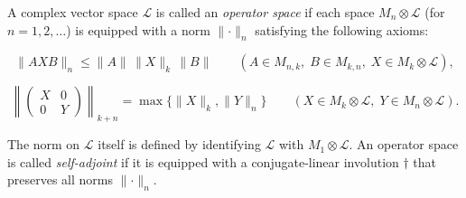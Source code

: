 \hypertarget{def:operator-space}{}%
\begin{definition}\label{def:operator-space}
A complex
vector space $\mathcal L$ is called an \emph{operator space} if each space
$M_n\otimes\mathcal L$ (for $n=1,2,\ldots$) is equipped with a norm
$\lVert\cdot\rVert_n$ satisfying the following axioms:

\[\lVert AXB\rVert_n \le \lVert A\rVert\,\lVert X\rVert_k\,\lVert B\rVert
\qquad (A\in M_{n,k},\; B\in M_{k,n},\; X\in M_k\otimes\mathcal L),\]

\[\left\lVert\begin{pmatrix}X&0\\ 0&Y\end{pmatrix}\right\rVert_{k+n}
= \max\bigl\{\lVert X\rVert_k,\lVert Y\rVert_n\bigr\}
\qquad (X\in M_k\otimes\mathcal L,\; Y\in M_n\otimes\mathcal L).\]

The norm on $\mathcal L$ itself is defined by identifying $\mathcal L$ with
$M_1\otimes\mathcal L$. An operator space is called \emph{self-adjoint} if it is
equipped with a conjugate-linear involution $\dagger$ that preserves all norms
$\lVert\cdot\rVert_n$.
\end{definition}
